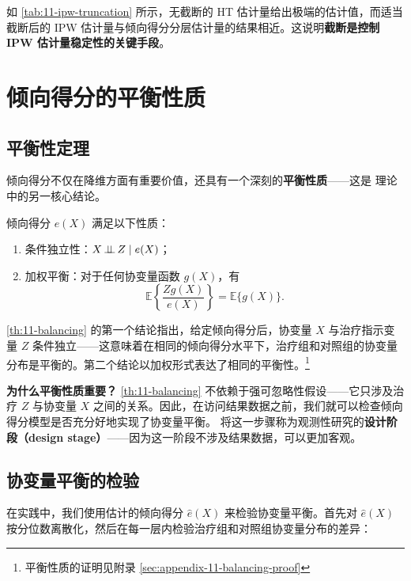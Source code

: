 如 \cref{tab:11-ipw-truncation} 所示，无截断的 HT 估计量给出极端的估计值，而适当截断后的 IPW 估计量与倾向得分分层估计量的结果相近。这说明\textbf{截断是控制 IPW 估计量稳定性的关键手段}。

\section{倾向得分的平衡性质}\label{sec:11-balancing}

\subsection{平衡性定理}\label{sec:11-balancing-theorem}

倾向得分不仅在降维方面有重要价值，还具有一个深刻的\textbf{平衡性质}——这是 \citet{RosenbaumRubin:1983} 理论中的另一核心结论。

\begin{Theorem}[倾向得分的平衡性质]\label{th:11-balancing}
倾向得分 $e(X)$ 满足以下性质：
\begin{enumerate}
  \item 条件独立性：$X \operatorname{\mathrel{\perp\!\!\!\perp}} Z \mid e(X)$；
  \item 加权平衡：对于任何协变量函数 $g(X)$，有
  \[
  \mathbb{E}\left\{ \frac{Z g(X)}{e(X)} \right\} = \mathbb{E}\{g(X)\} .
  \]
\end{enumerate}
\end{Theorem}

\cref{th:11-balancing} 的第一个结论指出，给定倾向得分后，协变量 $X$ 与治疗指示变量 $Z$ 条件独立——这意味着在相同的倾向得分水平下，治疗组和对照组的协变量分布是平衡的。第二个结论以加权形式表达了相同的平衡性。\footnote{平衡性质的证明见附录 \cref{sec:appendix-11-balancing-proof}}

\textbf{为什么平衡性质重要？} \cref{th:11-balancing} 不依赖于强可忽略性假设——它只涉及治疗 $Z$ 与协变量 $X$ 之间的关系。因此，在访问结果数据之前，我们就可以检查倾向得分模型是否充分好地实现了协变量平衡。\citet{Rubin:2007} 将这一步骤称为观测性研究的\textbf{设计阶段（design stage）}——因为这一阶段不涉及结果数据，可以更加客观。

\subsection{协变量平衡的检验}\label{sec:11-balance-check}

在实践中，我们使用估计的倾向得分 $\hat{e}(X)$ 来检验协变量平衡。首先对 $\hat{e}(X)$ 按分位数离散化，然后在每一层内检验治疗组和对照组协变量分布的差异：

